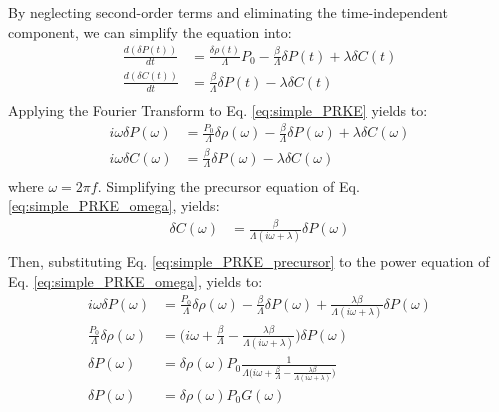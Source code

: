 By neglecting second-order terms and eliminating the time-independent component, we can simplify the equation into:
\begin{equation}
    \begin{aligned}\label{eq:simple_PRKE}
        \frac{d(\delta P(t))}{dt} &= \frac{\delta \rho(t)}{\Lambda} P_0 - \frac{\beta}{\Lambda} \delta P(t) + \lambda \delta C(t)\\
        \frac{d(\delta C(t))}{dt} &= \frac{\beta}{\Lambda} \delta P(t) - \lambda \delta C(t)\\
    \end{aligned}
\end{equation}
Applying the Fourier Transform to Eq. \ref{eq:simple_PRKE} yields to:
\begin{equation}
    \begin{aligned}\label{eq:simple_PRKE_omega}
        i \omega \delta P(\omega) &= \frac{P_0}{\Lambda} \delta \rho(\omega) - \frac{\beta}{\Lambda} \delta P(\omega) + \lambda \delta C(\omega)\\
        i \omega \delta C(\omega) &= \frac{\beta}{\Lambda} \delta P(\omega) - \lambda \delta C(\omega)\\
    \end{aligned}
\end{equation}
where $\omega = 2 \pi f$. Simplifying the precursor equation of Eq. \ref{eq:simple_PRKE_omega}, yields:
\begin{equation}
    \begin{aligned}\label{eq:simple_PRKE_precursor}
        \delta C(\omega) &= \frac{\beta}{\Lambda (i \omega + \lambda)} \delta P(\omega)\\
    \end{aligned}
\end{equation}
Then, substituting Eq. \ref{eq:simple_PRKE_precursor} to the power equation of Eq. \ref{eq:simple_PRKE_omega}, yields to:
\begin{equation}
    \begin{aligned}\label{eq:simple_power_omega}
        i \omega \delta P(\omega) &= \frac{P_0}{\Lambda} \delta \rho(\omega) - \frac{\beta}{\Lambda} \delta P(\omega) + \frac{\lambda \beta}{\Lambda (i \omega + \lambda)} \delta P(\omega)\\
        \frac{P_0}{\Lambda} \delta \rho(\omega) &= \biggl( i \omega +  \frac{\beta}{\Lambda} - \frac{\lambda \beta}{\Lambda (i \omega + \lambda)} \biggr) \delta P(\omega) \\
        \delta P(\omega) &= \delta \rho(\omega)P_0 \frac{1}{\Lambda \biggl( i \omega +  \frac{\beta}{\Lambda} - \frac{\lambda \beta}{\Lambda (i \omega + \lambda)} \biggr)} \\
        \delta P(\omega) &= \delta \rho(\omega)P_0 G(\omega)\\
    \end{aligned}
\end{equation}
